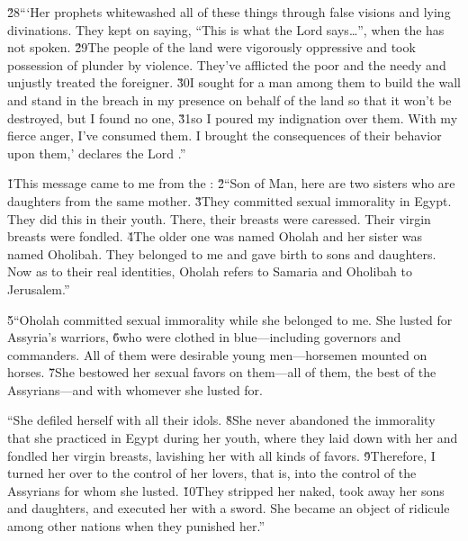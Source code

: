 \v{28}```Her prophets whitewashed all of these things through false visions and lying divinations. They kept on saying, ``This is what the Lord  says{\ldots}'', when the  has not spoken. \v{29}The people of the land were vigorously oppressive and took possession of plunder by violence. They've afflicted the poor and the needy and unjustly treated the foreigner. \v{30}I sought for a man among them to build the wall and stand in the breach in my presence on behalf of the land so that it won't be destroyed, but I found no one, \v{31}so I poured my indignation over them. With my fierce anger, I've consumed them. I brought the consequences of their behavior upon them,' declares the Lord .''

\v{1}This message came to me from the : \v{2}``Son of Man, here are two sisters who are daughters from the same mother. \v{3}They committed sexual immorality in Egypt. They did this in their youth. There, their breasts were caressed. Their virgin breasts were fondled. \v{4}The older one was named Oholah and her sister was named Oholibah. They belonged to me and gave birth to sons and daughters. Now as to their real identities, Oholah refers to Samaria and Oholibah to Jerusalem.''

\v{5}``Oholah committed sexual immorality while she belonged to me. She lusted for Assyria's warriors, \v{6}who were clothed in blue---including governors and commanders. All of them were desirable young men---horsemen mounted on horses. \v{7}She bestowed her sexual favors on them---all of them, the best of the Assyrians---and with whomever she lusted for.

``She defiled herself with all their idols. \v{8}She never abandoned the immorality that she practiced in Egypt during her youth, where they laid down with her and fondled her virgin breasts, lavishing her with all kinds of favors. \v{9}Therefore, I turned her over to the control of her lovers, that is, into the control of the Assyrians for whom she lusted. \v{10}They stripped her naked, took away her sons and daughters, and executed her with a sword. She became an object of ridicule among other nations when they punished her.''

